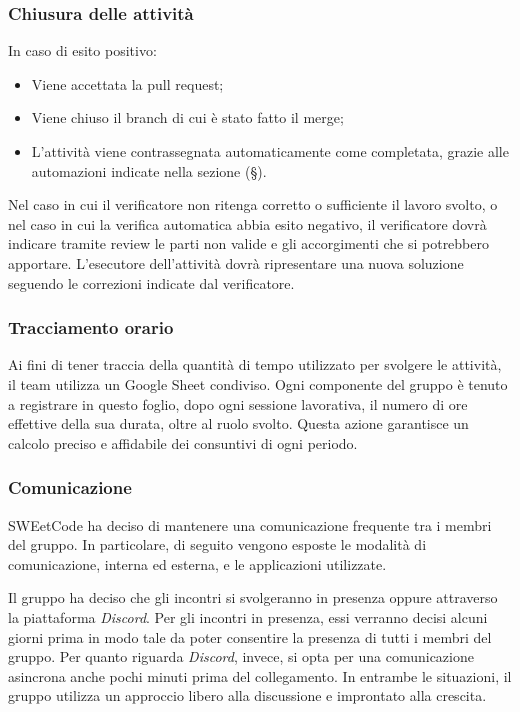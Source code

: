 \documentclass[10pt, a4paper]{article}
\begin{document}
\subsubsection{Chiusura delle attività}
In caso di esito positivo:
\begin{itemize}
    \item Viene accettata la pull request;
    \item Viene chiuso il branch di cui è stato fatto il merge;
    \item L'attività viene contrassegnata automaticamente come completata, grazie alle automazioni indicate nella sezione (\S {}).
\end{itemize}
Nel caso in cui il verificatore non ritenga corretto o sufficiente il lavoro svolto, o nel caso in cui la verifica automatica abbia esito negativo, il verificatore dovrà indicare tramite review le parti non valide e gli accorgimenti che si potrebbero apportare.
L'esecutore dell'attività dovrà ripresentare una nuova soluzione seguendo le correzioni indicate dal verificatore.

\subsubsection{Tracciamento orario}
Ai fini di tener traccia della quantità di tempo utilizzato per svolgere le attività, il team utilizza un Google Sheet condiviso.
Ogni componente del gruppo è tenuto a registrare in questo foglio, dopo ogni sessione lavorativa, il numero di ore effettive della sua durata, oltre al ruolo svolto.
Questa azione garantisce un calcolo preciso e affidabile dei consuntivi di ogni periodo. 

\subsubsection{Comunicazione}
\label{sec:comunicazione}
SWEetCode ha deciso di mantenere una comunicazione frequente tra i membri del gruppo. In particolare, di seguito vengono esposte le modalità di comunicazione, interna ed esterna, e le applicazioni utilizzate.


Il gruppo ha deciso che gli incontri si svolgeranno  in presenza oppure attraverso la piattaforma \textit{Discord}. Per gli incontri in presenza, essi verranno decisi alcuni giorni prima in modo tale da poter consentire la presenza di tutti i membri del gruppo. Per quanto riguarda \textit{Discord}, invece, si opta per una comunicazione asincrona anche pochi minuti prima del collegamento. In entrambe le situazioni, il gruppo utilizza un approccio libero alla discussione e improntato alla crescita.
\end{document}
